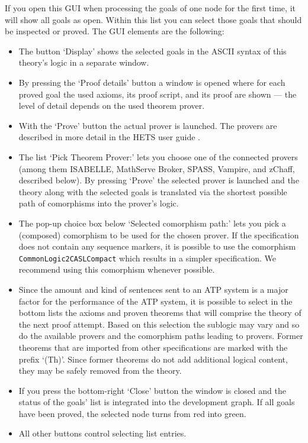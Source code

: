 \documentclass{article}
\newcommand{\normalTEXTSC}[2]{{#1\scriptsize#2}}
\newcommand     {\Hets}{\normalTEXTSC{H}{ETS}\xspace}
\newcommand     {\Isabelle}{\normalTEXTSC{I}{SABELLE}\xspace}
\newcommand     {\SPASS}{\normalTEXTSC{S}{PASS}\xspace}
\begin{document}
If you open this GUI when processing the goals of one node for the
first time, it will show all goals as open. Within this list you can
select those goals that should be inspected or proved. The GUI elements are the following:

\begin{itemize}
\item The button `Display' shows the selected goals in the ASCII syntax of
  this theory's logic in a separate window.
\item By pressing the `Proof details' button a window is opened where for each
  proved goal the used axioms, its proof script, and its proof are shown ---
  the level of detail depends on the used theorem prover.
\item With the `Prove' button the actual prover is launched. The provers are described
  in more detail in the \Hets user guide \cite{HetsUserGuide}.
\item The list `Pick Theorem Prover:' lets you choose one of the connected
  provers (among them \Isabelle, MathServe Broker, \SPASS, Vampire, and
  zChaff, described below). By pressing `Prove' the selected prover is
  launched and the theory along with the selected goals is translated via the
  shortest possible path of comorphisms into the prover's logic.
\item The pop-up choice box below `Selected comorphism path:' lets you pick a
  (composed) comorphism to be used for the chosen prover. If the specification
  does not contain any sequence markers, it is possible to use the comorphism
  \texttt{CommonLogic2CASLCompact} which results in a simpler 
  \CASL specification. We recommend using this comorphism whenever possible.
\item Since the amount and kind of sentences sent to an ATP system is a major
  factor for the performance of the ATP system, it is possible to select in
  the bottom lists the axioms and proven theorems that will comprise the
  theory of the next proof attempt. Based on this selection the sublogic may
  vary and so do the available provers and the comorphism paths leading to provers. Former
  theorems that are imported from other specifications are marked with the
  prefix `(Th)'. Since former theorems do not add additional logical content,
  they may be safely removed from the theory.
\item If you press the bottom-right `Close' button the window is closed and
  the status of the goals' list is integrated into the development graph. If
  all goals have been proved, the selected node turns from red into green.
\item All other buttons control selecting list entries.
\end{itemize}
\end{document}
